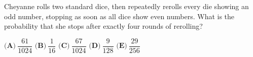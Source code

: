Cheyanne rolls two standard dice, then repeatedly rerolls every die showing an odd number, stopping as soon as all dice show even numbers. What is the probability that she stops after exactly four rounds of rerolling?

$\textbf{(A)}\ $$\dfrac{61}{1024}$ \qquad $\textbf{(B)}\ $$\dfrac1{16}$ \qquad $\textbf{(C)}\ $$\dfrac{67}{1024}$ \qquad $\textbf{(D)}\ $$\dfrac9{128}$ \qquad $\textbf{(E)}\ $$\dfrac{29}{256}$
